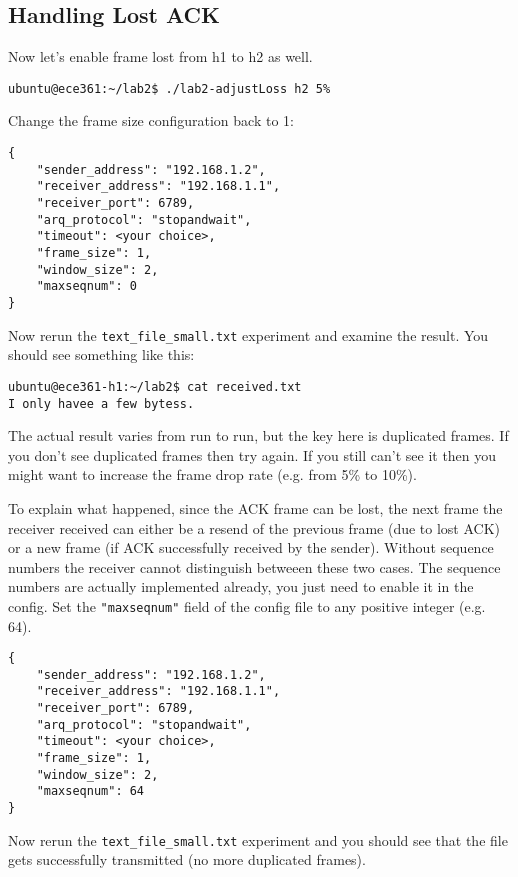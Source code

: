 \documentclass[11pt]{article}
\begin{document}
\subsection {Handling Lost ACK}
Now let's enable frame lost from h1 to h2 as well.
\begin{lstlisting}[style=ece361-shell-base]
ubuntu@ece361:~/lab2$ ./lab2-adjustLoss h2 5%
\end{lstlisting}

Change the frame size configuration back to 1:
\begin{lstlisting}[style=ece361-shell-base, caption={Configuration For Large File}]
{
    "sender_address": "192.168.1.2",
    "receiver_address": "192.168.1.1",
    "receiver_port": 6789,
    "arq_protocol": "stopandwait",
    "timeout": <your choice>,
    "frame_size": 1,
    "window_size": 2,
    "maxseqnum": 0
}
\end{lstlisting}
Now rerun the \texttt{text\_file\_small.txt} experiment and examine the result. You should see something like this:

\begin{lstlisting}[style=ece361-shell-base]
ubuntu@ece361-h1:~/lab2$ cat received.txt
I only havee a few bytess.
\end{lstlisting}
The actual result varies from run to run, but the key here is duplicated frames.
If you don't see duplicated frames then try again. If you still can't see it then you might want to increase the frame drop rate (e.g. from 5\% to 10\%).

To explain what happened, since the ACK frame can be lost, the next frame the receiver received can either be a resend of the previous frame (due to lost ACK) or a new frame (if ACK successfully received by the sender).
Without sequence numbers the receiver cannot distinguish betweeen these two cases.
The sequence numbers are actually implemented already, you just need to enable it in the config.
Set the \texttt{"maxseqnum"} field of the config file to any positive integer (e.g. 64).

\begin{lstlisting}[style=ece361-shell-base, caption={Configuration For Large File}]
{
    "sender_address": "192.168.1.2",
    "receiver_address": "192.168.1.1",
    "receiver_port": 6789,
    "arq_protocol": "stopandwait",
    "timeout": <your choice>,
    "frame_size": 1,
    "window_size": 2,
    "maxseqnum": 64
}
\end{lstlisting}

Now rerun the \texttt{text\_file\_small.txt} experiment and you should see that the file gets successfully transmitted (no more duplicated frames).
\end{document}
